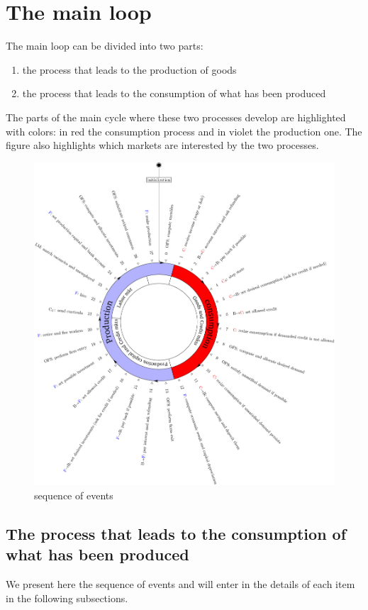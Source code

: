 \documentclass{book}
\begin{document}
\section{The main loop}\label{sec:mainloop}
The main loop can be divided into two parts:
\begin{enumerate}
	\item the process that leads to the production of goods
	\item the process that leads to the consumption of what has been produced
\end{enumerate}
The parts of the main cycle where these two processes develop are highlighted with colors: in red the consumption process and in violet the production one. The figure also highlights which markets are interested by the two processes.

\begin{figure}[htp]
	\centering
\includegraphics[scale=0.5]{visual1.pdf}
	\caption{sequence of events}
	\label{fig:clockcolor}
\end{figure}

\subsection{The process that leads to the consumption of what has been produced}
We present here the sequence of events and will enter in the details of each item in the following subsections.
\end{document}
